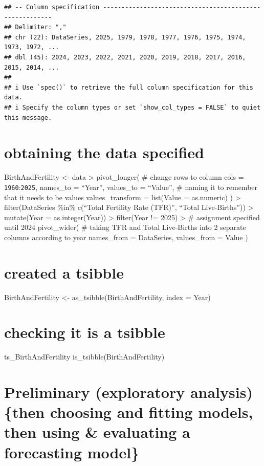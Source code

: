 \documentclass[
]{article}
\begin{document}
\begin{verbatim}
## -- Column specification --------------------------------------------------------
## Delimiter: ","
## chr (22): DataSeries, 2025, 1979, 1978, 1977, 1976, 1975, 1974, 1973, 1972, ...
## dbl (45): 2024, 2023, 2022, 2021, 2020, 2019, 2018, 2017, 2016, 2015, 2014, ...
## 
## i Use `spec()` to retrieve the full column specification for this data.
## i Specify the column types or set `show_col_types = FALSE` to quiet this message.
\end{verbatim}

\section{obtaining the data
specified}\label{obtaining-the-data-specified}

BirthAndFertility \textless- data \textbar\textgreater{} pivot\_longer(
\# change rows to column cols = \texttt{1960}:\texttt{2025}, names\_to =
``Year'', values\_to = ``Value'', \# naming it to remember that it needs
to be values values\_transform = list(Value = as.numeric) )
\textbar\textgreater{} filter(DataSeries \%in\% c(``Total Fertility Rate
(TFR)'', ``Total Live-Births'')) \textbar\textgreater{} mutate(Year =
as.integer(Year)) \textbar\textgreater{} filter(Year != 2025)
\textbar\textgreater{} \# assignment specified until 2024 pivot\_wider(
\# taking TFR and Total Live-Births into 2 separate columns according to
year names\_from = DataSeries, values\_from = Value )

\section{created a tsibble}\label{created-a-tsibble}

BirthAndFertility \textless- as\_tsibble(BirthAndFertility, index =
Year)

\section{checking it is a tsibble}\label{checking-it-is-a-tsibble}

ts\_BirthAndFertility is\_tsibble(BirthAndFertility)

\section{Preliminary (exploratory analysis) \{then choosing and fitting
models, then using \& evaluating a forecasting
model\}}\label{preliminary-exploratory-analysis-then-choosing-and-fitting-models-then-using-evaluating-a-forecasting-model}
\end{document}
